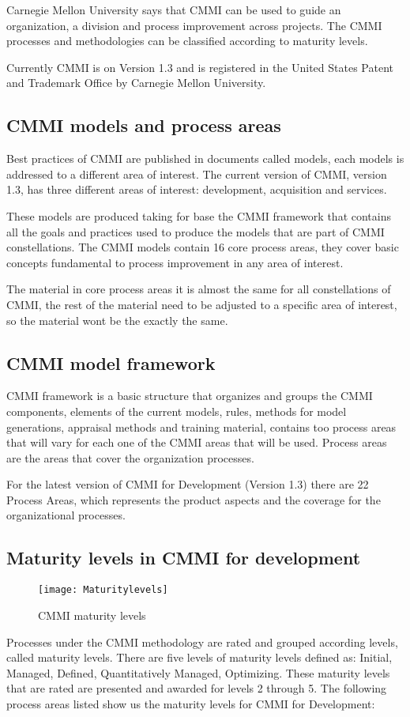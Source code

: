 Carnegie Mellon University says that CMMI can be used to guide an organization, a division and process improvement across projects. The CMMI processes and methodologies can be classified according to maturity levels.

Currently CMMI is on Version 1.3 and is registered in the United States Patent and Trademark Office by Carnegie Mellon University.

\subsection{CMMI models and process areas}
Best practices of CMMI are published in documents called models, each models is addressed to a different area of interest. The current version of CMMI, version 1.3, has three different areas of interest: development, acquisition and services.

These models are produced taking for base the CMMI framework that contains all the goals and practices used to produce the models that are part of CMMI constellations. The CMMI models contain 16 core process areas, they cover basic concepts fundamental to process improvement in any area of interest. 

The material in core process areas it is almost the same for all constellations of CMMI, the rest of the material need to be adjusted to a specific area of interest, so the material wont be the exactly the same.

\subsection{CMMI model framework}
CMMI framework is a basic structure that organizes and groups the CMMI components, elements of the current models, rules, methods for model generations, appraisal methods and training material, contains too process areas that will vary for each one of the CMMI areas that will be used. Process areas are the areas that cover the organization processes.

For the latest version of CMMI for Development (Version 1.3) there are 22 Process Areas, which represents the product aspects and the coverage for the organizational processes.

\subsection{Maturity levels in CMMI for development}
\begin{figure}[h]
	\begin{center}
		\leavevmode
		\texttt{[image: Maturitylevels]}
		\caption{CMMI maturity levels}
		\label{fig:maturitylevels}
	\end{center}
\end{figure}
Processes under the CMMI methodology are rated and grouped according levels, called maturity levels. There are five levels of maturity levels defined as: Initial, Managed, Defined, Quantitatively Managed, Optimizing. These maturity levels that are rated are presented and awarded for levels 2 through 5. The following process areas listed show us the maturity levels for CMMI for Development:


